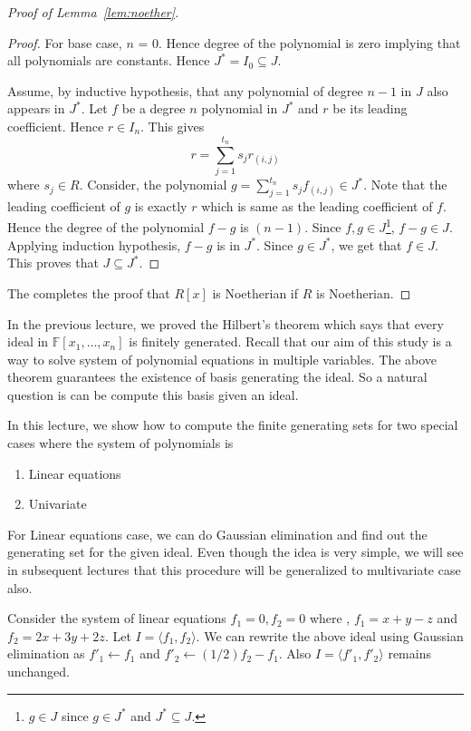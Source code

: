 \begin{proof}[Proof of Lemma~\ref{lem:noether}]
\begin{proof}
	For base case, $n$ = 0. Hence degree of the polynomial is zero
	implying that all polynomials are constants. Hence $J^* = I_0
	\subseteq J$. 
	
	Assume, by inductive hypothesis, that any polynomial of degree $n-1$ in
	$J$ also appears in $J^*$. Let $f$ be a degree $n$ polynomial in
	$J^*$ and $r$ be its leading coefficient. Hence $r \in I_n$. This
	gives
	\[ r=\sum_{j=1}^{t_n} s_j r_{(i,j)} \]
	where $s_j \in R$. 
	Consider, the polynomial $g = \sum_{j=1}^{t_n}s_j f_{(i,j)} \in J^*$. 
	Note that the leading coefficient of $g$ is exactly $r$ which is same
	as the leading coefficient of $f$. Hence the degree of the polynomial 
	$f-g$ is $(n-1)$. Since $f,g \in J$\footnote{$g \in J$ since $g \in
	J^*$ and $J^* \subseteq J$.}, $f-g \in J$. Applying 
	induction hypothesis, $f-g$ is in $J^*$. Since $g \in J^*$, we get
	that $f \in J$. This proves that $J \subseteq J^*$. 
\end{proof}
The completes the proof that $R[x]$ is Noetherian if $R$ is Noetherian.
\end{proof}

In the previous lecture, we proved the Hilbert's theorem which says that every
ideal in $\mathbb{F}[x_1,\ldots,x_n]$ is finitely generated. Recall that
our aim of this study is a way to solve system of polynomial equations in
multiple variables. The above theorem guarantees the existence of basis
generating the ideal. So a natural question is can be compute this basis given
an ideal.

In this lecture, we show how to compute the finite generating sets for two
special cases where the system of polynomials is
\begin{enumerate}
\item Linear equations
\item Univariate
\end{enumerate}
For Linear equations case, we can do Gaussian elimination and find out the
generating set for the given ideal. Even though the idea is very simple, we
will see in subsequent lectures that this procedure will be generalized to
multivariate case also.

\begin{example} Consider the system of linear equations $f_1=0,f_2=0$ where ,
$f_1 = x+y-z$ and $f_2=  2x+3y+2z$. Let $I=\langle 
f_1,f_2 \rangle$. We can rewrite the above ideal using Gaussian elimination as 
$f'_1 \leftarrow f_1$ and $f'_2 \leftarrow (1/2)f_2-f_1$. Also $I= \langle 
f'_1,f'_2 \rangle$ remains unchanged.
\end{example}

